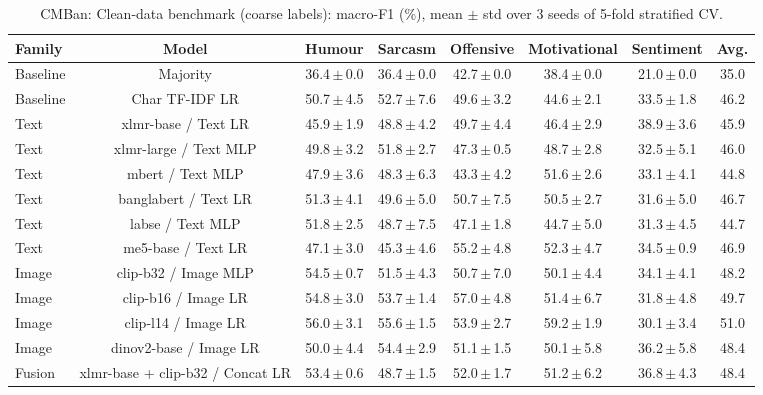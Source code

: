 \begin{table}[t]
\centering
\small
\caption{CMBan: Clean-data benchmark (coarse labels): macro-F1 (\%), mean $\pm$ std over 3 seeds of 5-fold stratified CV.}
\label{tab:bench_coarse_cmban}
\begin{adjustbox}{max width=\textwidth}
\begin{tabular}{lccccccc}
\toprule
Family & Model & Humour & Sarcasm & Offensive & Motivational & Sentiment & Avg. \\
\midrule
Baseline & Majority & 36.4\,$\pm$\,0.0 & 36.4\,$\pm$\,0.0 & 42.7\,$\pm$\,0.0 & 38.4\,$\pm$\,0.0 & 21.0\,$\pm$\,0.0 & 35.0 \\
Baseline & Char TF-IDF LR & 50.7\,$\pm$\,4.5 & 52.7\,$\pm$\,7.6 & 49.6\,$\pm$\,3.2 & 44.6\,$\pm$\,2.1 & 33.5\,$\pm$\,1.8 & 46.2 \\
Text & xlmr-base / Text LR & 45.9\,$\pm$\,1.9 & 48.8\,$\pm$\,4.2 & 49.7\,$\pm$\,4.4 & 46.4\,$\pm$\,2.9 & 38.9\,$\pm$\,3.6 & 45.9 \\
Text & xlmr-large / Text MLP & 49.8\,$\pm$\,3.2 & 51.8\,$\pm$\,2.7 & 47.3\,$\pm$\,0.5 & 48.7\,$\pm$\,2.8 & 32.5\,$\pm$\,5.1 & 46.0 \\
Text & mbert / Text MLP & 47.9\,$\pm$\,3.6 & 48.3\,$\pm$\,6.3 & 43.3\,$\pm$\,4.2 & 51.6\,$\pm$\,2.6 & 33.1\,$\pm$\,4.1 & 44.8 \\
Text & banglabert / Text LR & 51.3\,$\pm$\,4.1 & 49.6\,$\pm$\,5.0 & 50.7\,$\pm$\,7.5 & 50.5\,$\pm$\,2.7 & 31.6\,$\pm$\,5.0 & 46.7 \\
Text & labse / Text MLP & 51.8\,$\pm$\,2.5 & 48.7\,$\pm$\,7.5 & 47.1\,$\pm$\,1.8 & 44.7\,$\pm$\,5.0 & 31.3\,$\pm$\,4.5 & 44.7 \\
Text & me5-base / Text LR & 47.1\,$\pm$\,3.0 & 45.3\,$\pm$\,4.6 & 55.2\,$\pm$\,4.8 & 52.3\,$\pm$\,4.7 & 34.5\,$\pm$\,0.9 & 46.9 \\
Image & clip-b32 / Image MLP & 54.5\,$\pm$\,0.7 & 51.5\,$\pm$\,4.3 & 50.7\,$\pm$\,7.0 & 50.1\,$\pm$\,4.4 & 34.1\,$\pm$\,4.1 & 48.2 \\
Image & clip-b16 / Image LR & 54.8\,$\pm$\,3.0 & 53.7\,$\pm$\,1.4 & 57.0\,$\pm$\,4.8 & 51.4\,$\pm$\,6.7 & 31.8\,$\pm$\,4.8 & 49.7 \\
Image & clip-l14 / Image LR & 56.0\,$\pm$\,3.1 & 55.6\,$\pm$\,1.5 & 53.9\,$\pm$\,2.7 & 59.2\,$\pm$\,1.9 & 30.1\,$\pm$\,3.4 & 51.0 \\
Image & dinov2-base / Image LR & 50.0\,$\pm$\,4.4 & 54.4\,$\pm$\,2.9 & 51.1\,$\pm$\,1.5 & 50.1\,$\pm$\,5.8 & 36.2\,$\pm$\,5.8 & 48.4 \\
Fusion & xlmr-base + clip-b32 / Concat LR & 53.4\,$\pm$\,0.6 & 48.7\,$\pm$\,1.5 & 52.0\,$\pm$\,1.7 & 51.2\,$\pm$\,6.2 & 36.8\,$\pm$\,4.3 & 48.4 \\

\end{tabular}
\end{adjustbox}
\end{table}
